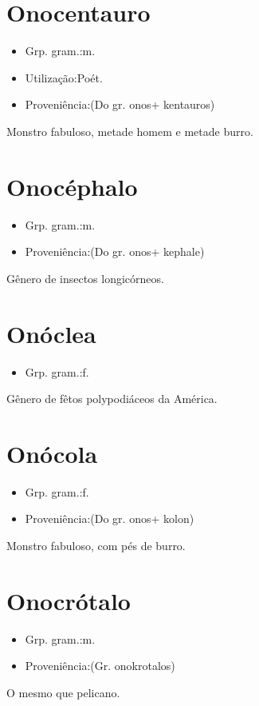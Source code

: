 \section{Onocentauro}
\begin{itemize}
\item {Grp. gram.:m.}
\end{itemize}
\begin{itemize}
\item {Utilização:Poét.}
\end{itemize}
\begin{itemize}
\item {Proveniência:(Do gr. \textunderscore onos\textunderscore  + \textunderscore kentauros\textunderscore )}
\end{itemize}
Monstro fabuloso, metade homem e metade burro.
\section{Onocéphalo}
\begin{itemize}
\item {Grp. gram.:m.}
\end{itemize}
\begin{itemize}
\item {Proveniência:(Do gr. \textunderscore onos\textunderscore  + \textunderscore kephale\textunderscore )}
\end{itemize}
Gênero de insectos longicórneos.
\section{Onóclea}
\begin{itemize}
\item {Grp. gram.:f.}
\end{itemize}
Gênero de fêtos polypodiáceos da América.
\section{Onócola}
\begin{itemize}
\item {Grp. gram.:f.}
\end{itemize}
\begin{itemize}
\item {Proveniência:(Do gr. \textunderscore onos\textunderscore  + \textunderscore kolon\textunderscore )}
\end{itemize}
Monstro fabuloso, com pés de burro.
\section{Onocrótalo}
\begin{itemize}
\item {Grp. gram.:m.}
\end{itemize}
\begin{itemize}
\item {Proveniência:(Gr. \textunderscore onokrotalos\textunderscore )}
\end{itemize}
O mesmo que \textunderscore pelicano\textunderscore .
